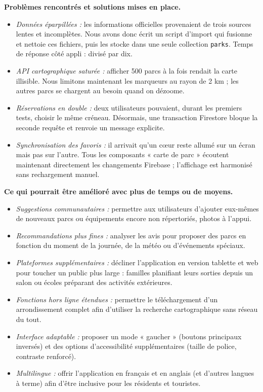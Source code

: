 \documentclass[12pt,a4paper]{article}
\begin{document}
\medskip\noindent
\textbf{Problèmes rencontrés et solutions mises en place.}
\begin{itemize}
  \item \emph{Données éparpillées :} les informations officielles
        provenaient de trois sources lentes et incomplètes. Nous avons
        donc écrit un script d'import qui fusionne et nettoie ces
        fichiers, puis les stocke dans une seule collection
        \texttt{parks}. Temps de réponse côté appli : divisé par dix.
  \item \emph{API cartographique saturée :} afficher 500 parcs à la fois
        rendait la carte illisible. Nous limitons maintenant les
        marqueurs au rayon de 2 km ; les autres parcs se chargent au
        besoin quand on dézoome.
  \item \emph{Réservations en double :} deux utilisateurs pouvaient,
        durant les premiers tests, choisir le même créneau. Désormais,
        une transaction Firestore bloque la seconde requête et renvoie
        un message explicite.
  \item \emph{Synchronisation des favoris :} il arrivait qu'un cœur
        reste allumé sur un écran mais pas sur l'autre. Tous les
        composants « carte de parc » écoutent maintenant directement
        les changements Firebase ; l'affichage est harmonisé sans
        rechargement manuel.
\end{itemize}

\medskip\noindent
\textbf{Ce qui pourrait être amélioré avec plus de temps ou de moyens.}
\begin{itemize}
  \item \emph{Suggestions communautaires :} permettre aux utilisateurs
        d'ajouter eux-mêmes de nouveaux parcs ou équipements encore non
        répertoriés, photos à l'appui.
  \item \emph{Recommandations plus fines :} analyser les avis pour
        proposer des parcs en fonction du moment de la journée, de la
        météo ou d'événements spéciaux.
  \item \emph{Plateformes supplémentaires :} décliner l'application en
        version tablette et web pour toucher un public plus large :
        familles planifiant leurs sorties depuis un salon ou écoles
        préparant des activités extérieures.
  \item \emph{Fonctions hors ligne étendues :} permettre le
        téléchargement d'un arrondissement complet afin d'utiliser la
        recherche cartographique sans réseau du tout.
  \item \emph{Interface adaptable :} proposer un mode « gaucher »
        (boutons principaux inversés) et des options d'accessibilité
        supplémentaires (taille de police, contraste renforcé).
  \item \emph{Multilingue :} offrir l'application en français et en
        anglais (et d'autres langues à terme) afin d'être inclusive
        pour les résidents et touristes.
\end{itemize}
\end{document}
